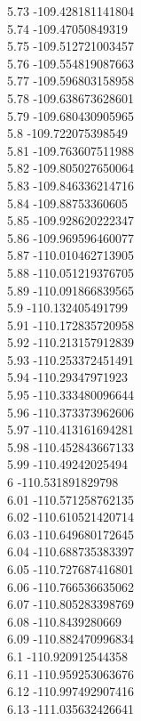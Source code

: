 {5.73	-109.428181141804\\
5.74	-109.47050849319\\
5.75	-109.512721003457\\
5.76	-109.554819087663\\
5.77	-109.596803158958\\
5.78	-109.638673628601\\
5.79	-109.680430905965\\
5.8	-109.722075398549\\
5.81	-109.763607511988\\
5.82	-109.805027650064\\
5.83	-109.846336214716\\
5.84	-109.88753360605\\
5.85	-109.928620222347\\
5.86	-109.969596460077\\
5.87	-110.010462713905\\
5.88	-110.051219376705\\
5.89	-110.091866839565\\
5.9	-110.132405491799\\
5.91	-110.172835720958\\
5.92	-110.213157912839\\
5.93	-110.253372451491\\
5.94	-110.29347971923\\
5.95	-110.333480096644\\
5.96	-110.373373962606\\
5.97	-110.413161694281\\
5.98	-110.452843667133\\
5.99	-110.49242025494\\
6	-110.531891829798\\
6.01	-110.571258762135\\
6.02	-110.610521420714\\
6.03	-110.649680172645\\
6.04	-110.688735383397\\
6.05	-110.727687416801\\
6.06	-110.766536635062\\
6.07	-110.805283398769\\
6.08	-110.8439280669\\
6.09	-110.882470996834\\
6.1	-110.920912544358\\
6.11	-110.959253063676\\
6.12	-110.997492907416\\
6.13	-111.035632426641\\
}

